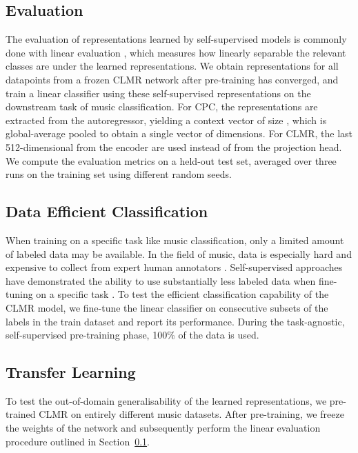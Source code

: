 \documentclass{article}
\begin{document}
\subsection{Evaluation}
\label{sec:evaluation}
The evaluation of representations learned by self-supervised models is commonly done with linear evaluation \cite{oord_representation_2019,hjelm_learning_2019,chen_simple_2020}, which measures how linearly separable the relevant classes are under the learned representations.
We obtain representations  for all datapoints from a frozen CLMR network after pre-training has converged, and train a linear classifier using these self-supervised representations on the downstream task of music classification.
For CPC, the representations are extracted from the autoregressor, yielding a context vector  of size , which is global-average pooled to obtain a single vector of  dimensions.
For CLMR, the last 512-dimensional  from the encoder are used instead of  from the projection head.
We compute the evaluation metrics on a held-out test set, averaged over three runs on the training set using different random seeds.


\subsection{Data Efficient Classification}
When training on a specific task like music classification, only a limited amount of labeled data may be available. In the field of music, data is especially hard and expensive to collect from expert human annotators \cite{doi:10.1080/09298215.2019.1613436}.
Self-supervised approaches have demonstrated the ability to use substantially less labeled data when fine-tuning on a specific task \cite{henaff2019data,chen_simple_2020,chen2020big}.
To test the efficient classification capability of the CLMR model, we fine-tune the linear classifier on consecutive subsets of the labels in the train dataset and report its performance.
During the task-agnostic, self-supervised pre-training phase, 100\% of the data is used.

\subsection{Transfer Learning}
To test the out-of-domain generalisability of the learned representations, we pre-trained CLMR on entirely different music datasets.
After pre-training, we freeze the weights of the network and subsequently perform the linear evaluation procedure outlined in Section~\ref{sec:evaluation}.
\end{document}
